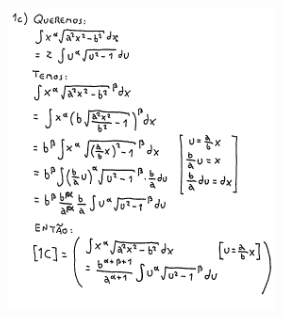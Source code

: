 \documentclass[oneside,12pt]{article}
\begin{document}
\includegraphics[height=8cm]{2020-2-C2/20210502_C2_P2_1c.pdf}

\newpage

\end{document}
